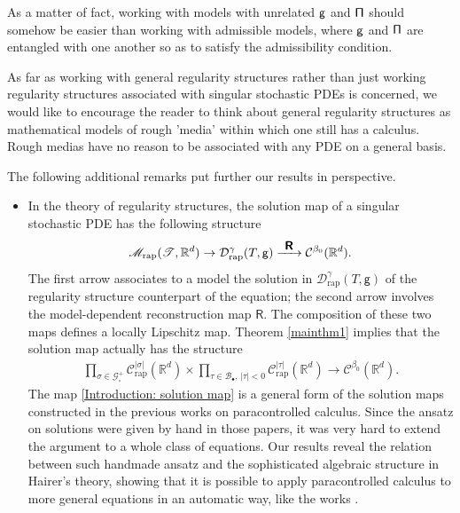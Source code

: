 \documentclass[JEP,XML,SOM,Unicode,published]{cedram}
\newcommand{\To}[1]{\mathchoice{\xrightarrow{\textstyle\kern4pt#1\kern3pt}}{\stackrel{#1}{\longrightarrow}}{}{}}
\newcommand{\sbullet}{{\scriptscriptstyle\bullet}}
\theoremstyle{plain}
\theoremstyle{definition}
\newcommand{\rap}{\mathrm{rap}}
\newcommand{\reR}{\boldsymbol{\mathsf{R}}}
\newcommand{\sfg}{\mathsf{g}}
\newcommand{\scrM}{\mathscr{M}}
\newcommand{\scrT}{\mathscr{T}}
\newcommand{\bbR}{\mathbb{R}}
\newcommand{\mcB}{\mathcal{B}}
\newcommand{\mcC}{\mathcal{C}}
\newcommand{\mcD}{\mathcal{D}}
\newcommand{\mcG}{\mathcal{G}}
\begin{document}
As a matter of fact, working with models with unrelated $\sf g$ and $\sf \Pi$ should somehow be easier than working with admissible models, where $\sf g$ and $\sf \Pi$ are entangled with one another so as to satisfy the admissibility condition.

As far as working with general regularity structures rather than just working regularity structures associated with singular stochastic PDEs is concerned, we would like to encourage the reader to think about general regularity structures as mathematical models of rough 'media' within which one still has a calculus. Rough medias have no reason to be associated with any PDE on a general basis.

The following additional remarks put further our results in perspective.
\begin{itemize}
	\item In the theory of regularity structures, the solution map of a singular stochastic PDE has the following structure
\[
\scrM_\rap(\scrT,\bbR^d) \to \mcD_\rap^\gamma(T,\sfg) \To{\reR} \mcC^{\beta_0}(\bbR^d).
\]
The first arrow associates to a model the solution in $\mcD_\rap^\gamma(T,\sfg)$ of the regularity structure counterpart of the equation; the second arrow involves the model-dependent reconstruction map $\reR$. The composition of these two maps defines a locally Lipschitz map. Theorem \ref{mainthm1} implies that the solution map actually has the structure
\begin{align}\label{Introduction: solution map}
\prod_{\sigma\in\mcG_\circ^+} \mcC_\rap^{|\sigma|}(\bbR^d) \times \prod_{\tau\in\mcB_\sbullet,\,|\tau|<0} \mcC_\rap^{|\tau|}(\bbR^d)
\to \mcC^{\beta_0}(\bbR^d).
\end{align}
The map \eqref{Introduction: solution map} is a general form of the solution maps constructed in the previous works \cite{GIP, BB16} on paracontrolled calculus. Since the ansatz on solutions were given by hand in those papers, it was very hard to extend the argument to a whole class of equations. Our results reveal the relation between such handmade ansatz and the sophisticated algebraic structure in Hairer's theory, showing that it is possible to apply paracontrolled calculus to more general equations in an automatic way, like the works \cite{Hai, BHZ, CH16, BCCH18}.
	

\end{itemize}
\end{document}
